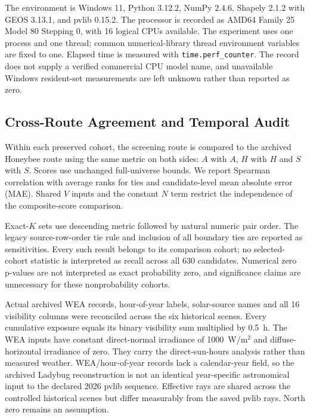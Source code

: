 \documentclass{llncs}
\begin{document}
The environment is Windows 11, Python 3.12.2, NumPy 2.4.6, Shapely 2.1.2 with GEOS 3.13.1, and pvlib 0.15.2. The processor is recorded as AMD64 Family 25 Model 80 Stepping 0, with 16 logical CPUs available. The experiment uses one process and one thread; common numerical-library thread environment variables are fixed to one. Elapsed time is measured with \texttt{time.perf\_counter}. The record does not supply a verified commercial CPU model name, and unavailable Windows resident-set measurements are left unknown rather than reported as zero.

\subsection{Cross-Route Agreement and Temporal Audit}
Within each preserved cohort, the screening route is compared to the archived Honeybee route using the same metric on both sides: $A$ with $A$, $H$ with $H$ and $S$ with $S$. Scores use unchanged full-universe bounds. We report Spearman correlation with average ranks for ties and candidate-level mean absolute error (MAE). Shared $V$ inputs and the constant $N$ term restrict the independence of the composite-score comparison.

Exact-$K$ sets use descending metric followed by natural numeric pair order. The legacy source-row-order tie rule and inclusion of all boundary ties are reported as sensitivities. Every such result belongs to its comparison cohort; no selected-cohort statistic is interpreted as recall across all 630 candidates. Numerical zero p-values are not interpreted as exact probability zero, and significance claims are unnecessary for these nonprobability cohorts.

Actual archived WEA records, hour-of-year labels, solar-source names and all 16 visibility columns were reconciled across the six historical scenes. Every cumulative exposure equals its binary visibility sum multiplied by 0.5~h. The WEA inputs have constant direct-normal irradiance of 1000~W/m$^2$ and diffuse-horizontal irradiance of zero. They carry the direct-sun-hours analysis rather than measured weather. WEA/hour-of-year records lack a calendar-year field, so the archived Ladybug reconstruction is not an identical year-specific astronomical input to the declared 2026 pvlib sequence. Effective rays are shared across the controlled historical scenes but differ measurably from the saved pvlib rays. North zero remains an assumption.
\end{document}
